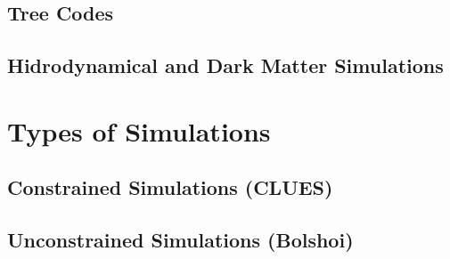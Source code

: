 	\subsection{Tree Codes}
	\label{subsec:TreeCodes}


	\subsection{Hidrodynamical and Dark Matter Simulations}
	\label{subsec:HidrodynamicalAndDarkMatterSimulations}






\section{Types of Simulations}
\label{sec:Types of Simulations}


	\subsection{Constrained Simulations (CLUES)}
	\label{subsec:ConstrainedSimulations}


	\subsection{Unconstrained Simulations (Bolshoi)}
	\label{subsec:UnconstrainedSimulations}





